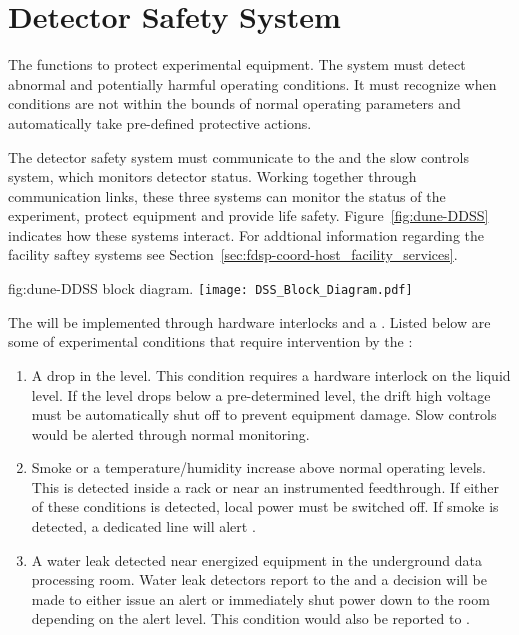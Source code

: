 \section{ Detector Safety System}
\label{sec:fdsp-coord-det-safety}


The  functions to protect experimental equipment.  The
system must detect abnormal and potentially harmful operating
conditions.  It must recognize when conditions are not within the
bounds of normal operating parameters and automatically take
pre-defined protective actions.


The detector safety system must communicate to the \surf {}
and the  slow controls system, which monitors detector
status.  Working together through communication links, these three
systems can monitor the status of the experiment, protect equipment
and provide life safety. Figure~\ref{fig:dune-DDSS} indicates how
these systems interact. For addtional information regarding the
facility saftey systems see
Section~\ref{sec:fdsp-coord-host_facility_services}.
\begin{dunefigure}{fig:dune-DDSS}
  { block diagram.}
  \texttt{[image: DSS\_Block\_Diagram.pdf]}
\end{dunefigure}


The  will be implemented through hardware interlocks and a
.  Listed below are some of  experimental
conditions that require intervention by the :
\begin{enumerate}
 \item A drop in the  level.  This condition requires a hardware
   interlock on the liquid level.  If the level drops below a
   pre-determined level, the drift high voltage must be automatically 
   shut off to prevent equipment damage.  Slow controls would be
   alerted through normal monitoring.
 \item Smoke or a temperature/humidity increase above normal operating
   levels. This is detected inside a rack or near an instrumented
   feedthrough.  If either of these conditions is detected, local
   power must be switched off. If smoke is detected, a
   dedicated line will alert .
 \item A water leak detected near energized equipment in the 
   underground data processing room.  Water leak detectors 
   report to the   and a decision will be made to either
   issue an alert or immediately shut power down to the room depending
   on the alert level.  This condition would also be reported
   to .
\end{enumerate}

